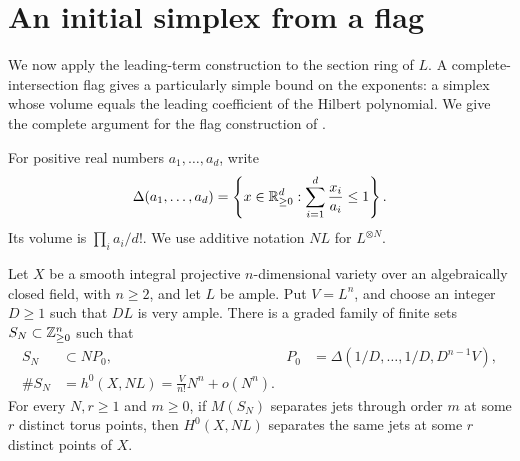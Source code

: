 \section{An initial simplex from a flag}\label{sec:flag}

We now apply the leading-term construction to the section ring of $L$.
A complete-intersection flag gives a particularly simple bound on the
exponents: a simplex whose volume equals the leading coefficient of the
Hilbert polynomial.  We give the complete argument for the flag
construction of \cite[Section~3]{OpenAI2026Higher}.

For positive real numbers $a_1,\ldots,a_d$, write
\[
 \Delta(a_1,\ldots,a_d)
 =\left\{x\in\mathbb R_{\geq0}^d:
       \sum_{i=1}^d\frac{x_i}{a_i}\leq1\right\}.
\]
Its volume is $\prod_i a_i/d!$.  We use additive notation $NL$ for
$L^{\otimes N}$.

\begin{proposition}\label{prop:initial-simplex}
Let $X$ be a smooth integral projective $n$-dimensional variety over an
algebraically closed field, with $n\geq2$, and let $L$ be ample.  Put
$V=L^n$, and choose an integer $D\geq1$ such that $DL$ is very ample.
There is a graded family of finite sets $S_N\subset\mathbb Z_{\geq0}^n$ such
that
\begin{align}
 S_N&\subset NP_0,
 &P_0&=\Delta(1/D,\ldots,1/D,D^{n-1}V),
 \label{eq:initial-simplex}\\
 \#S_N&=h^0(X,NL)
       =\frac{V}{n!}N^n+o(N^n).
 \label{eq:initial-dimension}
\end{align}
For every $N,r\geq1$ and $m\geq0$, if $M(S_N)$ separates jets through
order $m$ at some $r$ distinct torus points, then $H^0(X,NL)$ separates
the same jets at some $r$ distinct points of $X$.
\end{proposition}

